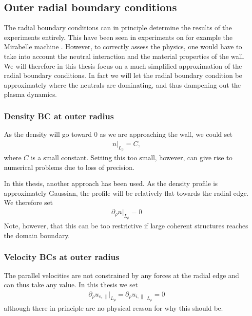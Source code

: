 \subsection{Outer radial boundary conditions}
\label{sec:outerBC}
%
The radial boundary conditions can in principle determine the results of the experiments entirely.
This have been seen in experiments on for example the Mirabelle machine \cite{Schroder2001}.
However, to correctly assess the physics, one would have to take into account the neutral interaction and the material properties of the wall.
We will therefore in this thesis focus on a much simplified approximation of the radial boundary conditions.
In fact we will let the radial boundary condition be approximately where the neutrals are dominating, and thus dampening out the plasma dynamics.

\subsubsection{Density BC at outer radius}
As the density will go toward $0$ as we are approaching the wall, we could set
%
\begin{align*}
    n \bigg|_{L_\rho} = C,
\end{align*}
%
where $C$ is a small constant.
Setting this too small, however, can give rise to numerical problems due to loss of precision.

In this thesis, another approach has been used.
As the density profile is approximately Gaussian, the profile will be relatively flat towards the radial edge.
We therefore set
%
\begin{align*}
    \partial_\rho n \bigg|_{L_\rho} = 0
\end{align*}
%
Note, however, that this can be too restrictive if large coherent structures reaches the domain boundary.

\subsubsection{Velocity BCs at outer radius}
%
The parallel velocities are not constrained by any forces at the radial edge and can thus take any value.
In this thesis we set
%
\begin{align*}
    \partial_\rho u_{e,\|} \bigg|_{L_\rho} = \partial_\rho u_{i,\|} \bigg|_{L_\rho} = 0
\end{align*}
%
although there in principle are no physical reason for why this should be.

